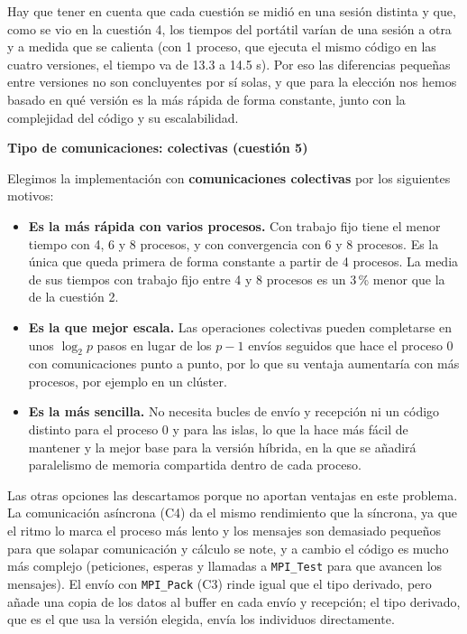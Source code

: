 \documentclass[12pt]{article}
\begin{document}
\begin{enumerate}
Hay que tener en cuenta que cada cuestión se midió en una sesión distinta y que, como se vio en la cuestión 4, los tiempos del portátil varían de una sesión a otra y a medida que se calienta (con 1 proceso, que ejecuta el mismo código en las cuatro versiones, el tiempo va de 13.3 a 14.5 s). Por eso las diferencias pequeñas entre versiones no son concluyentes por sí solas, y que para la elección nos hemos basado en qué versión es la más rápida de forma constante, junto con la complejidad del código y su escalabilidad.

\vspace{0.5cm}

\medskip
\noindent\textbf{Tipo de comunicaciones: colectivas (cuestión 5)}\par
\smallskip

Elegimos la implementación con \textbf{comunicaciones colectivas} por los siguientes motivos:

\begin{itemize}
    \item \textbf{Es la más rápida con varios procesos.} Con trabajo fijo tiene el menor tiempo con 4, 6 y 8 procesos, y con convergencia con 6 y 8 procesos. Es la única que queda primera de forma constante a partir de 4 procesos. La media de sus tiempos con trabajo fijo entre 4 y 8 procesos es un 3\,\% menor que la de la cuestión 2.
    \item \textbf{Es la que mejor escala.} Las operaciones colectivas pueden completarse en unos $\log_2 p$ pasos en lugar de los $p-1$ envíos seguidos que hace el proceso 0 con comunicaciones punto a punto, por lo que su ventaja aumentaría con más procesos, por ejemplo en un clúster.
    \item \textbf{Es la más sencilla.} No necesita bucles de envío y recepción ni un código distinto para el proceso 0 y para las islas, lo que la hace más fácil de mantener y la mejor base para la versión híbrida, en la que se añadirá paralelismo de memoria compartida dentro de cada proceso.
\end{itemize}

Las otras opciones las descartamos porque no aportan ventajas en este problema. La comunicación asíncrona (C4) da el mismo rendimiento que la síncrona, ya que el ritmo lo marca el proceso más lento y los mensajes son demasiado pequeños para que solapar comunicación y cálculo se note, y a cambio el código es mucho más complejo (peticiones, esperas y llamadas a \texttt{MPI\_Test} para que avancen los mensajes). El envío con \texttt{MPI\_Pack} (C3) rinde igual que el tipo derivado, pero añade una copia de los datos al buffer en cada envío y recepción; el tipo derivado, que es el que usa la versión elegida, envía los individuos directamente.


\end{enumerate}
\end{document}
